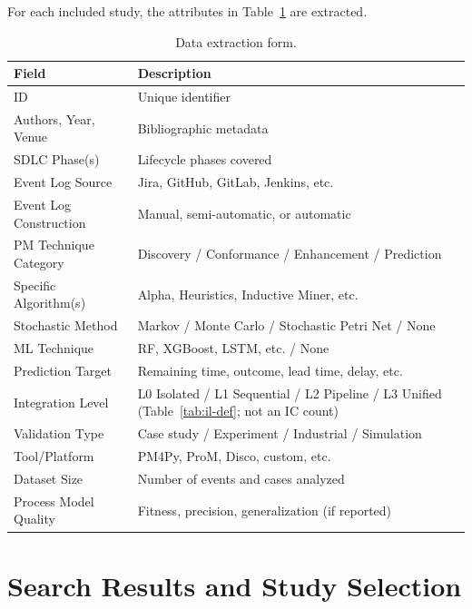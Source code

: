 For each included study, the attributes in Table~\ref{tab:extraction} are
extracted.

\begin{table}[htbp]
\centering
\caption{Data extraction form.}
\label{tab:extraction}
\small
\setlength{\tabcolsep}{4pt}
\begin{tabular}{p{3.6cm} p{8.1cm}}
\toprule
\textbf{Field} & \textbf{Description} \\
\midrule
ID                           & Unique identifier \\
Authors, Year, Venue         & Bibliographic metadata \\
SDLC Phase(s)                & Lifecycle phases covered \\
Event Log Source             & Jira, GitHub, GitLab, Jenkins, etc. \\
Event Log Construction       & Manual, semi-automatic, or automatic \\
PM Technique Category        & Discovery / Conformance / Enhancement / Prediction \\
Specific Algorithm(s)        & Alpha, Heuristics, Inductive Miner, etc. \\
Stochastic Method            & Markov / Monte Carlo / Stochastic Petri Net / None \\
ML Technique                 & RF, XGBoost, LSTM, etc. / None \\
Prediction Target            & Remaining time, outcome, lead time, delay, etc. \\
Integration Level            & L0 Isolated / L1 Sequential / L2 Pipeline / L3 Unified
                               (Table~\ref{tab:il-def}; not an IC count) \\
Validation Type              & Case study / Experiment / Industrial / Simulation \\
Tool/Platform                & PM4Py, ProM, Disco, custom, etc. \\
Dataset Size                 & Number of events and cases analyzed \\
Process Model Quality        & Fitness, precision, generalization (if reported) \\
\bottomrule
\end{tabular}
\end{table}


\section{Search Results and Study Selection}
\label{sec:slr-results-selection}

